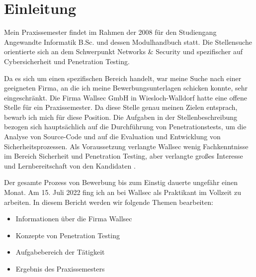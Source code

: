 \section{Einleitung}


Mein Praxissemester findet im Rahmen der  2008 für den Studiengang Angewandte Informatik B.Sc. und dessen Modulhandbuch \citep{Hochschule_Worms_FPO} statt. Die Stellensuche orientierte sich an dem Schwerpunkt Networks \& Security und spezifischer auf Cybersicherheit und Penetration Testing. 

Da es sich um einen spezifischen Bereich handelt, war meine Suche nach einer geeigneten Firma, an die ich meine Bewerbungsunterlagen schicken konnte, sehr eingeschränkt. Die Firma Wallsec GmbH in Wiesloch-Walldorf hatte eine offene Stelle für ein Praxissemester. Da diese Stelle genau meinen Zielen entsprach, bewarb ich mich für diese Position. Die Aufgaben in der Stellenbeschreibung bezogen sich hauptsächlich auf die Durchführung von Penetrationstests, um die Analyse von Source-Code und auf die Evaluation und Entwicklung von Sicherheitsprozessen. Als Voraussetzung verlangte Wallsec wenig Fachkenntnisse im Bereich Sicherheit und Penetration Testing, aber verlangte großes Interesse und Lernbereitschaft von den Kandidaten \citep{Wallsec}.

Der gesamte Prozess von Bewerbung bis zum Einstig dauerte ungefähr einen Monat. Am 15. Juli 2022 fing ich an bei Wallsec als Praktikant im Vollzeit zu arbeiten. In diesem Bericht werden wir folgende Themen bearbeiten:

\begin{itemize}
   \item Informationen über die Firma Wallsec
   \item Konzepte von Penetration Testing
   \item Aufgabebereich der Tätigkeit
   \item Ergebnis des Praxissemesters
\end{itemize}

